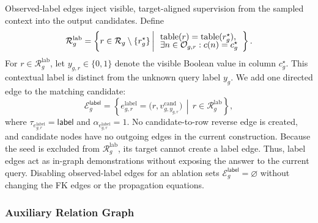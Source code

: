 Observed-label edges inject visible, target-aligned supervision from the
sampled context into the output candidates. Define
\begin{equation}
  \mathcal R_g^{\mathrm{lab}}
  =
  \left\{
    r\in\mathcal R_g\setminus\{r_g^\star\}
    \,\middle|\,
    \begin{array}{l}
      \operatorname{table}(r)=\operatorname{table}(r_g^\star),\\[-1mm]
      \exists n\in\mathcal O_{g,r}:c(n)=c_g^\star
    \end{array}
  \right\}.
\label{eq:method:observed-label-rows}
\end{equation}
For \(r\in\mathcal R_g^{\mathrm{lab}}\), let
\(y_{g,r}\in\{0,1\}\) denote the visible Boolean value in column
\(c_g^\star\). This contextual label is distinct from the unknown query
label \(y_g\). We add one directed edge to the matching candidate:
\begin{equation}
  \mathcal E_g^{\mathsf{label}}
  =
  \left\{
    e_{g,r}^{\mathrm{label}}
    =
    \bigl(r,v_{g,y_{g,r}}^{\mathrm{cand}}\bigr)
    \,\middle|\,
    r\in\mathcal R_g^{\mathrm{lab}}
  \right\},
\label{eq:method:label-edges}
\end{equation}
where
\(\tau_{e_{g,r}^{\mathrm{label}}}=\mathsf{label}\) and
\(\alpha_{e_{g,r}^{\mathrm{label}}}=1\). No candidate-to-row reverse edge
is created, and candidate nodes have no outgoing edges in the current
construction. Because the seed is excluded from
\(\mathcal R_g^{\mathrm{lab}}\), its target cannot create a label edge.
Thus, label edges act as in-graph demonstrations without exposing the
answer to the current query. Disabling observed-label edges for an ablation
sets \(\mathcal E_g^{\mathsf{label}}=\varnothing\) without changing the FK
edges or the propagation equations.

\subsubsection{Auxiliary Relation Graph}
\label{sec:method:relation-graph}

